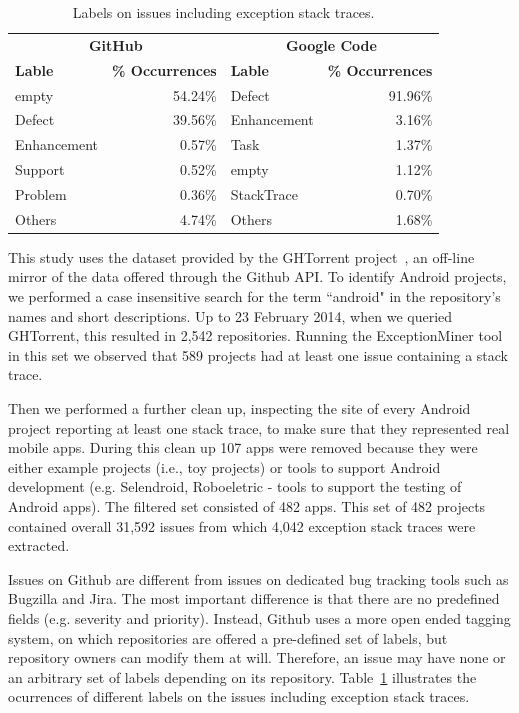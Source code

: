 \documentclass[conference]{IEEEtran}
\begin{document}
\begin{table}
  \centering
  \begin{tabular}{lr|lr}
    \hline
     \multicolumn{2}{c}{\bfseries{GitHub}} &  \multicolumn{2}{c}{\bfseries{Google Code}} \\
      \bfseries{Lable} &  \bfseries{\% Occurrences} &  \bfseries{Lable} &  \bfseries{\% Occurrences} \\
    \hline
empty &	54.24\% & Defect &	91.96\% \\
Defect &	39.56\%  & Enhancement  &	3.16\% \\
Enhancement &	0.57\% & Task	& 1.37\% \\
Support &	0.52\% & empty &	1.12\% \\
Problem &	0.36\% & StackTrace &	0.70\% \\
Others &	4.74\% &  Others &	1.68\% \\   
  \hline
  \end{tabular}
  \caption{Labels on issues including exception stack traces.}
  \label{tab:lables}
\end{table}


This study uses the dataset provided by the GHTorrent project~\cite{Gousi13}, 
an off-line mirror of the data  offered through the Github API.  
To identify Android projects, we performed a case insensitive search for the
term ``android" in the repository's names and short descriptions.  
Up to 23 February 2014,  when we queried GHTorrent, this resulted in 2,542 repositories. Running the ExceptionMiner tool 
 in this set we observed that 589 projects had at least one issue containing a stack trace.
	
Then we performed a further clean up, inspecting the site of every Android project
reporting at least one stack trace, to make sure that they represented real
mobile apps. During this clean up 107 apps were removed because they were either
example projects (i.e., toy projects) or tools to support Android development
(e.g. Selendroid, Roboeletric - tools to support the testing of Android apps).
The filtered set consisted of 482 apps. This set of 482 projects contained overall 31,592 issues from which 4,042 exception stack traces 
were extracted. 

Issues on Github are different from issues on dedicated bug tracking tools such as 
Bugzilla and Jira. The most important difference is that there are no predefined fields
  (e.g. severity and priority). Instead, Github uses a more open ended tagging system, on which
repositories are offered a pre-defined set of labels, but repository owners can modify 
them at will. Therefore, an issue may have none or an arbitrary set of labels depending 
on its repository. Table~\ref{tab:lables} illustrates the ocurrences of different labels 
on the issues including exception stack traces.
\end{document}
